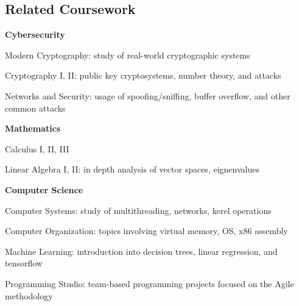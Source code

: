 \documentclass[11pt,letterpaper]{article}
\newenvironment{indentsection}[1]%
{\begin{list}{}%
	{\setlength{\leftmargin}{#1}}%
	\item[]%
}
{\end{list}}
\begin{document}
\subsection*{Related Coursework}
	\begin{indentsection}{\parindent}
		\begin{itemize*}
		\item \textbf{Cybersecurity} 
		\vspace{-0.2em}
			\begin{itemize*}
				\item Modern Cryptography: study of real-world cryptographic systems
				\item Cryptography I, II: public key cryptosystems, number theory, and attacks
				\item Networks and Security: usage of spoofing/sniffing, buffer overflow, and other common attacks
			\end{itemize*}
		\item \textbf{Mathematics} 
		\vspace{-0.2em}
			\begin{itemize*}
				\item Calculus I, II, III
				\item Linear Algebra I, II: in depth analysis of vector spaces, eignenvalues
			\end{itemize*}
		\item \textbf{Computer Science}
		\vspace{-0.2em}
			\begin{itemize*}
				\item Computer Systems: study of multithreading, networks, kerel operations
				\item Computer Organization: topics involving virtual memory, OS, x86 assembly
				\item Machine Learning: introduction into decision trees, linear regression, and tensorflow
				\item Programming Studio: team-based programming projects focused on the Agile methodology 
			\end{itemize*}
		\end{itemize*}
	\end{indentsection}
\else 
\end{document}
